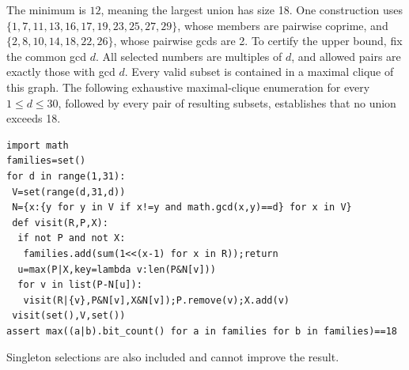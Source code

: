 The minimum is $\boxed{12}$, meaning the largest union has size 18. One construction uses $\{1,7,11,13,16,17,19,23,25,27,29\}$, whose members are pairwise coprime, and $\{2,8,10,14,18,22,26\}$, whose pairwise gcds are 2. To certify the upper bound, fix the common gcd $ d $. All selected numbers are multiples of $ d $, and allowed pairs are exactly those with gcd $ d $. Every valid subset is contained in a maximal clique of this graph. The following exhaustive maximal-clique enumeration for every $ 1\le d\le30 $, followed by every pair of resulting subsets, establishes that no union exceeds 18.
\begin{verbatim}
import math
families=set()
for d in range(1,31):
 V=set(range(d,31,d))
 N={x:{y for y in V if x!=y and math.gcd(x,y)==d} for x in V}
 def visit(R,P,X):
  if not P and not X:
   families.add(sum(1<<(x-1) for x in R));return
  u=max(P|X,key=lambda v:len(P&N[v]))
  for v in list(P-N[u]):
   visit(R|{v},P&N[v],X&N[v]);P.remove(v);X.add(v)
 visit(set(),V,set())
assert max((a|b).bit_count() for a in families for b in families)==18
\end{verbatim}
Singleton selections are also included and cannot improve the result.
